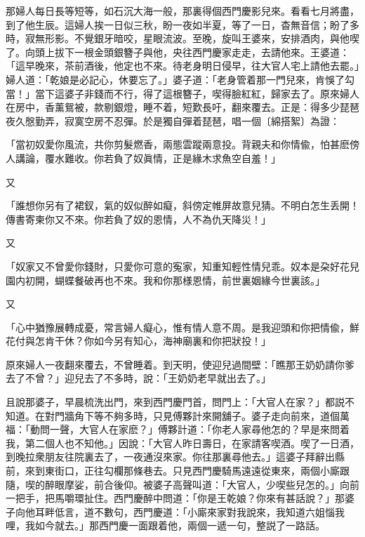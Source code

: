 那婦人每日長等短等，如石沉大海一般，那裏得個西門慶影兒來。看看七月將盡，到了他生辰。這婦人挨一日似三秋，盼一夜如半夏，等了一日，杳無音信；盼了多時，寂無形影。不覺銀牙暗咬，星眼流波。至晚，旋叫王婆來，安排酒肉，與他喫了。向頭上拔下一根金頭銀簪子與他，央往西門慶家走走，去請他來。王婆道：「這早晚來，茶前酒後，他定也不來。待老身明日侵早，往大官人宅上請他去罷。」婦人道：「乾娘是必記心，休要忘了。」婆子道：「老身管着那一門兒來，肯悞了勾當！」當下這婆子非錢而不行，得了這根簪子，喫得臉紅紅，歸家去了。原來婦人在房中，香薰鴛被，款剔銀燈，睡不着，短歎長吁，翻來覆去。正是：得多少琵琶夜久慇勤弄，寂寞空房不忍彈。於是獨自彈着琵琶，唱一個〔綿搭絮〕為證：

\begin{myquote}
「當初奴愛你風流，共你剪髮燃香，兩態雲蹤兩意投。背親夫和你情偸，怕甚麽傍人講論，覆水難收。你若負了奴眞情，正是緣木求魚空自羞！」
\end{myquote}

又
\begin{myquote}
「誰想你另有了裙釵，氣的奴似醉如癡，斜傍定帷屏故意兒猜。不明白怎生丢開！傳書寄柬你又不來。你若負了奴的恩情，人不為仇天降災！」
\end{myquote}

又
\begin{myquote}
「奴家又不曾愛你錢財，只愛你可意的寃家，知重知輕性情兒乖。奴本是朶好花兒園内初開，蝴蝶餐破再也不來。我和你那様恩情，前世裏姻緣今世裏該。」
\end{myquote}

又
\begin{myquote}
「心中猶豫展轉成憂，常言婦人癡心，惟有情人意不周。是我迎頭和你把情偸，鮮花付與怎肯干休？你如今另有知心，海神廟裏和你把狀投！」
\end{myquote}

原來婦人一夜翻來覆去，不曾睡着。到天明，使迎兒過間壁：「瞧那王奶奶請你爹去了不曾？」迎兒去了不多時，說：「王奶奶老早就出去了。」

且說那婆子，早晨梳洗出門，來到西門慶門首，問門上：「大官人在家？」都説不知道。在對門牆角下等不夠多時，只見傅夥計來開舖子。婆子走向前來，道個萬福：「動問一聲，大官人在家麽？」傅夥計道：「你老人家尋他怎的？早是來問着我，第二個人也不知他。」因說：「大官人昨日壽日，在家請客喫酒。喫了一日酒，到晚拉衆朋友往院裏去了，一夜通沒來家。你往那裏尋他去。」這婆子拜辭出縣前，來到東街口，正往勾欄那條巷去。只見西門慶騎馬遠遠從東來，兩個小廝跟隨，喫的醉眼摩娑，前合後仰。被婆子高聲叫道：「大官人，少喫些兒怎的。」向前一把手，把馬嚼環扯住。西門慶醉中問道：「你是王乾娘？你來有甚話說？」那婆子向他耳畔低言，道不數句，西門慶道：「小廝來家對我說來，我知道六姐惱我哩，我如今就去。」那西門慶一面跟着他，兩個一遞一句，整説了一路話。


